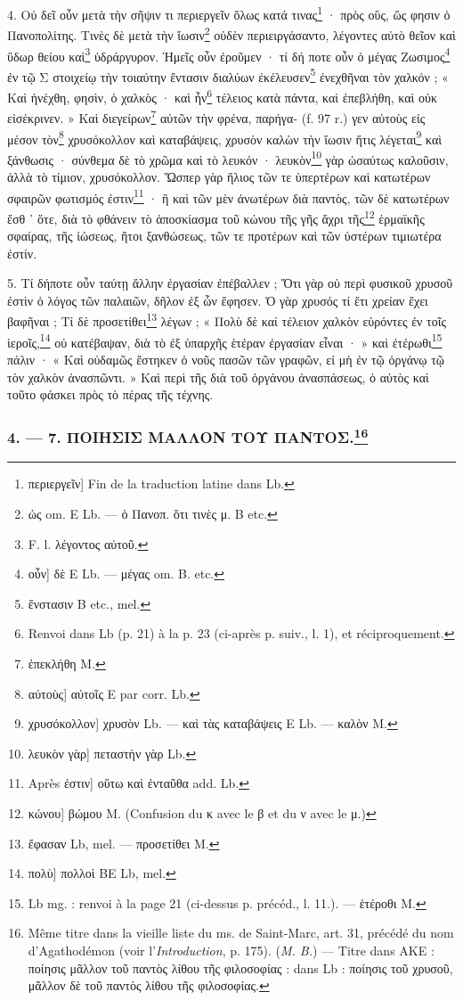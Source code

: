 \documentclass[a4paper, 11pt, oneside, polutonikogreek, french]{article}
\begin{document}
4. Οὐ δεῖ οὖν μετὰ τὴν σῆψιν τι περιεργεῖν ὅλως κατά τινας\footnote{περιεργεῖν] Fin de la traduction latine dans Lb.} · πρὸς οὓς, ὥς φησιν ὁ Πανοπολίτης. Τινὲς δὲ μετὰ τὴν ἴωσιν\footnote{ὡς om. E Lb. --- ὁ Πανοπ. ὅτι τινὲς μ. B etc.} οὐδὲν περιειργάσαντο, λέγοντες αὐτὸ θεῖον καὶ ὕδωρ θείου καὶ\footnote{F. l. λέγοντος αὐτοῦ.} ὑδράργυρον. Ἡμεῖς οὖν ἐροῦμεν · τί δή ποτε οὖν ὁ μέγας Ζωσιμος\footnote{οὖν] δὲ E Lb. --- μέγας om. B. etc.} ἐν τῷ Σ στοιχείῳ τὴν τοιαύτην ἔντασιν διαλύων ἐκέλευσεν\footnote{ἕνστασιν B etc., mel.} ἐνεχθῆναι τὸν χαλκόν ; « Καὶ ἠνέχθη, φησὶν, ὁ χαλκὸς · καὶ ἦν\footnote{Renvoi dans Lb (p. 21) à la p. 23 (ci-après p. suiv., l. 1), et réciproquement.} τέλειος κατὰ πάντα, καὶ ἐπεβλήθη, καὶ οὐκ εἰσέκρινεν. » Καὶ διεγείρων\footnote{ἐπεκλήθη M.} αὐτῶν τὴν φρένα, παρήγα- (f. 97 r.) γεν αὐτοὺς εἰς μέσον τὸν\footnote{αὐτοὺς] αύτοῖς E par corr. Lb.} χρυσόκολλον καὶ καταβάψεις, χρυσὸν καλὼν τὴν ἴωσιν ἥτις λέγεται\footnote{χρυσόκολλον] χρυσὸν Lb. --- καὶ τὰς καταβάψεις E Lb. --- καλὸν M.} καὶ ξάνθωσις · σύνθεμα δὲ τὸ χρῶμα καὶ τὸ λευκόν · λευκὸν\footnote{λευκὸν γὰρ] πεταστὴν γὰρ Lb.} γὰρ ὡσαύτως καλοῦσιν, ἀλλὰ τὸ τίμιον, χρυσόκολλον. Ὥσπερ γὰρ ἥλιος τῶν τε ὑπερτέρων καὶ κατωτέρων σφαιρῶν φωτισμός ἐστιν\footnote{Après ἐστιν] οὕτω καὶ ἐνταῦθα add. Lb.} · ἢ καὶ τῶν μὲν ἀνωτέρων διὰ παντὸς, τῶν δὲ κατωτέρων ἔσθ ᾽ ὅτε, διὰ τὸ φθάνειν τὸ ἀποσκίασμα τοῦ κώνου τῆς γῆς ἄχρι τῆς\footnote{κώνου] βώμου M. (Confusion du κ avec le β et du ν avec le μ.)} ἑρμαϊκῆς σφαίρας, τῆς ἰώσεως, ἤτοι ξανθώσεως, τῶν τε προτέρων καὶ τῶν ὑστέρων τιμιωτέρα ἐστίν.

5. Τί δήποτε οὖν ταύτῃ ἄλλην ἐργασίαν ἐπέβαλλεν ; Ὅτι γὰρ οὐ περὶ φυσικοῦ χρυσοῦ ἐστὶν ὁ λόγος τῶν παλαιῶν, δῆλον ἐξ ὧν ἔφησεν. Ὁ γὰρ χρυσός τί ἔτι χρείαν ἔχει βαφῆναι ; Τί δὲ προσετίθει\footnote{ἔφασαν Lb, mel. --- προσετίθει M.} λέγων ; « Πολὺ δὲ καί τέλειον χαλκὸν εὑρόντες ἐν τοῖς ἱεροῖς,\footnote{πολὺ] πολλοὶ BE Lb, mel.} οὐ κατέβαψαν, διὰ τὸ ἐξ ὑπαρχῆς ἑτέραν ἐργασίαν εἶναι · » καὶ ἐτέρωθι\footnote{Lb mg. : renvoi à la page 21 (ci-dessus p. précéd., l. 11.). --- ἑτέροθι M.} πάλιν · « Καὶ οὐδαμῶς ἕστηκεν ὁ νοῦς πασῶν τῶν γραφῶν, εἰ μὴ ἐν τῷ ὀργάνῳ τῷ τὸν χαλκὸν ἀνασπῶντι. » Καὶ περὶ τῆς διὰ τοῦ ὀργάνου ἀνασπάσεως, ὁ αὐτὸς καὶ τοῦτο φάσκει πρὸς τὸ πέρας τῆς τέχνης.

\bigskip
\centerline{\EightStarTaper}
\centerline{\EightStarTaper\EightStarTaper}
\bigskip

\subsubsection[4. --- 7. ΠΟΙΗΣΙΣ ΜΑΛΛΟΝ ΤΟΥ ΠΑΝΤΟΣ.]{4. --- 7. ΠΟΙΗΣΙΣ ΜΑΛΛΟΝ ΤΟΥ ΠΑΝΤΟΣ.\footnote{Même titre dans la vieille liste du ms. de Saint-Marc, art. 31, précédé du nom d'Agathodémon (voir l'\emph{Introduction}, p. 175). (\emph{M. B.}) --- Titre dans AKE : ποίησις μᾶλλον τοῦ παντὸς λίθου τῆς φιλοσοφίας : dans Lb : ποίησις τοῦ χρυσοῦ, μᾶλλον δὲ τοῦ παντὸς λίθου τῆς φιλοσοφίας.}}
\end{document}
